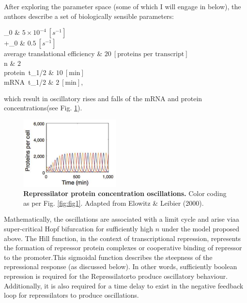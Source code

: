 \documentclass[runningheads,a4paper]{llncs}
\makeatletter
\newenvironment{conditions}
  {\par\setlength{\leftskip}{1cm}\vspace{\abovedisplayskip}\noindent
   \tabularx{0.9\columnwidth}{>{$}l<{$} @{${}\ =\ {}$} >{\raggedright\arraybackslash}X}}
  {\endtabularx\par\setlength{\leftskip}{1cm}\vspace{\belowdisplayskip}}
\makeatother
\begin{document}
After exploring the parameter space (some of which I will engage in below), the authors describe a set of biologically sensible parameters:

\begin{conditions}
    \alpha_{0}                                  &   $5\times 10^{-4}\ [s^{-1}]$  \\
    \alpha+\alpha_{0}                           &   $0.5\ [s^{-1}]$    \\
    \textrm{average translational efficiency}   &   $20\ [\textrm{proteins per transcript}]$  \\
    n                                           &   $2$   \\
    \textrm{protein}\ t_{1/2}                   &   $10\ [\textrm{min}]$    \\
    \textrm{mRNA}\ t_{1/2}                      &   $2\ [\textrm{min}]$, \\
\end{conditions}

\noindent which result in oscillatory rises and falls of the mRNA and protein concentrations\linebreak (see Fig. \ref{fig:fig2})\cite{Elowitz2000d}.

\begin{figure}
    \singlespacing
    \centering
    \includegraphics[width=0.45\textwidth]{fig/original_oscilations.png}
    \caption{\textbf{Repressilator protein concentration oscillations.} Color coding as per Fig. \ref{fig:fig1}. Adapted from Elowitz \& Leibier (2000)\cite{Elowitz2000d}.}
    \label{fig:fig2}
\end{figure}

Mathematically, the oscillations are associated with a limit cycle and arise via\linebreak a super-critical Hopf bifurcation for sufficiently high $n$ under the model proposed above\cite{Purcell2010a, Muller2006, Elowitz2000d}. The Hill function, in the context of transcriptional repression, represents the formation of repressor protein complexes or cooperative binding of repressor to the promoter\cite{Gonze2013a}.\linebreak This sigmoidal function describes the steepness of the repressional response (as discussed below). In other words, sufficiently boolean repression is required for the Repressilator\linebreak to produce oscillatory behaviour\cite{Purcell2010a}. Additionally, it is also required for a time delay to exist in the negative feedback loop for repressilators to produce oscillations\cite{Purcell2010a,Gonze2020}.
\end{document}
